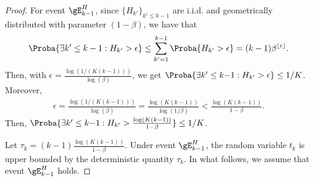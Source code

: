 \begin{proof}
    For event $\gE_{k-1}^H$, since $\{H_{k'}\}_{k'\le k{-}1}$ are i.i.d. and geometrically distributed with parameter $(1-\beta)$, we have that
    \begin{align*}
        \Proba{\exists k'\le k-1: H_{k'}>\epsilon} \le \sum_{k'=1}^{k-1} \Proba{H_{k'}>\epsilon} =(k-1)\beta^{\lfloor \epsilon\rfloor}.
    \end{align*}
    Then, with $\epsilon=\frac{\log(1/(K(k-1)))}{\log(\beta)}$, we get $\Proba{\exists k'\le k{-}1: H_{k'}>\epsilon}\le 1/K$.
    Moreover,
    \begin{align*}
        \epsilon = \frac{\log(1/(K(k-1)))}{\log(\beta)}= \frac{\log(K(k-1))}{\log(1/\beta)} < \frac{\log(K(k-1))}{1-\beta}.
    \end{align*}
    Then, $\Proba{\exists k'\le k{-}1: H_{k'}>\frac{\log(K(k-1))}{1-\beta}}\le 1/K$.

    Let $\tau_k = (k-1)\frac{\log(K(k-1))}{1-\beta}$. Under event $\gE_{k-1}^H$, the random variable $t_k$ is upper bounded by the deterministic quantity $\tau_k$. In what follows, we assume that event $\gE_{k-1}^H$ holds.


\end{proof}
